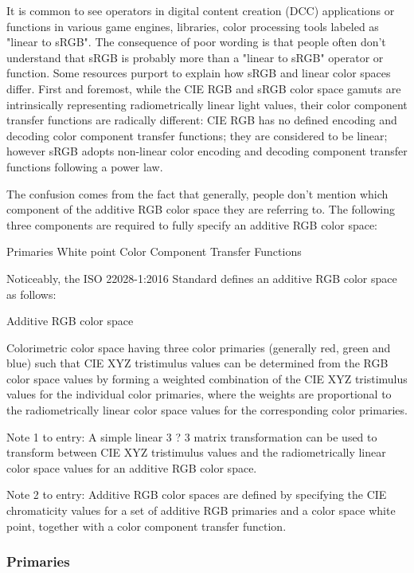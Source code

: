 It is common to see operators in digital content creation (DCC) applications or functions in various game engines, libraries, color processing tools labeled as "linear to sRGB". The consequence of poor wording is that people often don't understand that sRGB is probably more than a "linear to sRGB" operator or function. Some resources purport to explain how sRGB and linear color spaces differ.
First and foremost, while the CIE RGB and sRGB color space gamuts are intrinsically representing radiometrically linear light values, their color component transfer functions are radically different: CIE RGB has no defined encoding and decoding color component transfer functions; they are considered to be linear; however sRGB adopts non-linear color encoding and decoding component transfer functions following a power law.

The confusion comes from the fact that generally, people don't mention which component of the additive RGB color space they are referring to. The following three components are required to fully specify an additive RGB color space:

Primaries
White point
Color Component Transfer Functions

Noticeably, the ISO 22028-1:2016 Standard defines an additive RGB color space as follows:

	Additive RGB color space

Colorimetric color space having three color primaries (generally red, green and blue) such that CIE XYZ tristimulus values can be determined from the RGB color space values by forming a weighted combination of the CIE XYZ tristimulus values for the individual color primaries, where the weights are proportional to the radiometrically linear color space values for the corresponding color primaries.

Note 1 to entry: A simple linear 3 ? 3 matrix transformation can be used to transform between CIE XYZ tristimulus values and the radiometrically linear color space values for an additive RGB color space.

Note 2 to entry: Additive RGB color spaces are defined by specifying the CIE chromaticity values for a set of additive RGB primaries and a color space white point, together with a color component transfer function.

\subsubsection{Primaries}%
\label{subsubsec:primaries}


